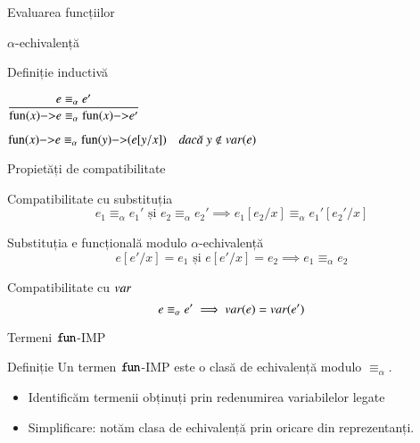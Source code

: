 \documentclass[xcolor=pdftex,romanian,colorlinks]{beamer}
\begin{document}
\begin{section}{Evaluarea funcțiilor}
\begin{subsection}{$\alpha$-echivalență}
\begin{frame}{Definiție inductivă}
\begin{itemize}
\vitem[]
$\displaystyle\reg{\fun{x}{e} \equiv_\alpha \fun{x}{e'}}{e \equiv_\alpha e'}{}$

\vitem[]
$\displaystyle\reg{\fun{x}{e} \equiv_\alpha \fun{y}{(e[y/x])}}{}{y\not\in\var(e)}$
\end{itemize}
\end{frame}

\begin{frame}{Propietăți de compatibilitate}
\begin{block}{Compatibilitate cu substituția}
\[e_1 \equiv_\alpha e_1'  \mbox{ și } e_2 \equiv_\alpha e_2' \implies e_1[e_2/x] \equiv_\alpha e_1'[e_2'/x]\]
\end{block}

\begin{block}{Substituția e funcțională modulo $\alpha$-echivalență}
\[e[e'/x] = e_1 \mbox{ și } e[e'/x] = e_2 \implies e_1 \equiv_\alpha e_2\]
\end{block}


\vfill\begin{block}{Compatibilitate cu $\mathop{var}$}
\[e \equiv_\alpha e'  \implies \mathop{var}(e) = \mathop{var}(e')\]
\end{block}
\end{frame}

\begin{frame}{Termeni $\mathrel{\text{\ttfamily fun}}$-IMP}
  \begin{block}{Definiție}
    Un termen $\mathrel{\text{\ttfamily fun}}$-IMP este o clasă de echivalență modulo $\equiv_\alpha$.
  \end{block}

\vfill
\begin{itemize}
\item Identificăm termenii obținuți prin redenumirea variabilelor legate
\item Simplificare: notăm clasa de echivalență prin oricare din reprezentanți.
\end{itemize}
\end{frame}

\end{subsection}
\end{section}
\end{document}
